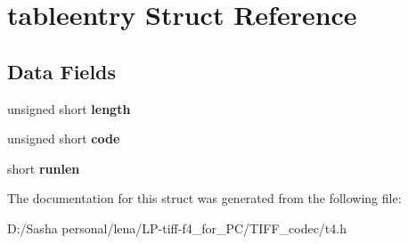 \hypertarget{structtableentry}{}\section{tableentry Struct Reference}
\label{structtableentry}
\subsection*{Data Fields}
\begin{DoxyCompactItemize}
\item 
\hypertarget{structtableentry_a92fb67cb6d873cedc8c09a2d901396a2}{}unsigned short {\bfseries length}\label{structtableentry_a92fb67cb6d873cedc8c09a2d901396a2}

\item 
\hypertarget{structtableentry_ad5035e9ddbe5118f0f35c4db612d13c2}{}unsigned short {\bfseries code}\label{structtableentry_ad5035e9ddbe5118f0f35c4db612d13c2}

\item 
\hypertarget{structtableentry_ad6aa059fb5260ddc405ccdefd292178c}{}short {\bfseries runlen}\label{structtableentry_ad6aa059fb5260ddc405ccdefd292178c}

\end{DoxyCompactItemize}


The documentation for this struct was generated from the following file\+:\begin{DoxyCompactItemize}
\item 
D\+:/\+Sasha personal/lena/\+L\+P-\/tiff-\/f4\+\_\+for\+\_\+\+P\+C/\+T\+I\+F\+F\+\_\+codec/t4.\+h\end{DoxyCompactItemize}
